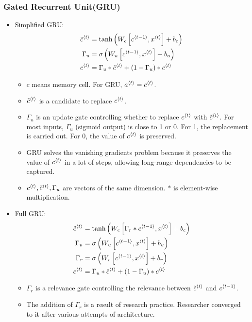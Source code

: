 \subsubsection{Gated Recurrent Unit(GRU)}
\begin{itemize}
  \item Simplified GRU: 
  \begin{align*}
    \tilde{c}^{\left\langle t\right\rangle}&=\tanh\left(W_c\left[c^{\left\langle t-1\right\rangle},x^{\left\langle t\right\rangle}\right]+b_c\right)\\
    \Gamma_u&=\sigma\left(W_u\left[c^{\left\langle t-1\right\rangle},x^{\left\langle t\right\rangle}\right]+b_u\right)\\
    c^{\left\langle t\right\rangle}&=\Gamma_u\ast \tilde{c}^{\left\langle t\right\rangle}+\left(1-\Gamma_u\right)\ast c^{\left\langle t\right\rangle}
  \end{align*}
  \begin{itemize}
    \item $c$ means memory cell. For GRU, $a^{\left\langle t\right\rangle}=c^{\left\langle t\right\rangle}$.
    \item $\tilde{c}^{\left\langle t\right\rangle}$ is a candidate to replace $c^{\left\langle t\right\rangle}$. 
    \item $\Gamma_u$ is an update gate controlling whether to replace $c^{\left\langle t\right\rangle}$ with $\tilde{c}^{\left\langle t\right\rangle}$. For most inputs, $\Gamma_u$ (sigmoid output) is close to 1 or 0. For 1, the replacement is carried out. For 0, the value of $c^{\left\langle t\right\rangle}$ is preserved. 
    \item GRU solves the vanishing gradients problem because it preserves the value of $c^{\left\langle t\right\rangle}$ in a lot of steps, allowing long-range dependencies to be captured.
    \item $c^{\left\langle t\right\rangle}, \tilde{c}^{\left\langle t\right\rangle}, \Gamma_u$ are vectors of the same dimension. $\ast$ is element-wise multiplication.
  \end{itemize}
  \item Full GRU:
  \begin{align*}
    \tilde{c}^{\left\langle t\right\rangle}&=\tanh\left(W_c\left[\Gamma_r\ast c^{\left\langle t-1\right\rangle},x^{\left\langle t\right\rangle}\right]+b_c\right)\\
    \Gamma_u&=\sigma\left(W_u\left[c^{\left\langle t-1\right\rangle},x^{\left\langle t\right\rangle}\right]+b_u\right)\\
    \Gamma_r&=\sigma\left(W_r\left[c^{\left\langle t-1\right\rangle},x^{\left\langle t\right\rangle}\right]+b_r\right)\\
    c^{\left\langle t\right\rangle}&=\Gamma_u\ast \tilde{c}^{\left\langle t\right\rangle}+\left(1-\Gamma_u\right)\ast c^{\left\langle t\right\rangle}
  \end{align*}
  \begin{itemize}
    \item $\Gamma_r$ is a relevance gate controlling the relevance between $\tilde{c}^{\left\langle t\right\rangle}$ and $c^{\left\langle t-1\right\rangle}$.
    \item The addition of $\Gamma_r$ is a result of research practice. Researcher converged to it after various attempts of architecture. 
  \end{itemize}
\end{itemize}
